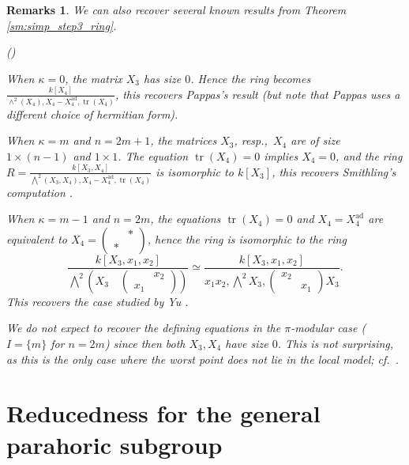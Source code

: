 \documentclass[pdflatex,sn-mathphys-num]{sn-jnl}%
\theoremstyle{thmstyleone}%
\theoremstyle{thmstyletwo}%
\newtheorem{remarks}[subsubsection]{Remarks}%
\numberwithin{equation}{subsection}
\theoremstyle{thmstylethree}%
\newcommand{\ad}{\mathrm{ad}}
\DeclareMathOperator{\tr}{tr}
\newenvironment{altenumerate}
	{\begin{list}
			{(\theenumi) }
			{\usecounter{enumi}
				\setlength{\labelwidth}{0pt}
				\setlength{\labelsep}{0pt}
				\setlength{\leftmargin}{0pt}
				\setlength{\itemsep}{\the\smallskipamount}
				\renewcommand{\theenumi}{\roman{enumi}}
		}}
		{\end{list}}
\begin{document}
		
\begin{remarks}\label{max_red:recover}
We can also recover several known results from Theorem \ref{sm:simp_step3_ring}.
\begin{altenumerate}
\item When $\kappa=0$, the matrix $X_3$ has size $0$. Hence the ring becomes $\frac{k[X_4]}{\wedge^2(X_4), X_4-X_4^{\ad},\tr(X_4)}$, this recovers Pappas's result \cite{Pappas2000} (but note that Pappas uses a different choice of hermitian form).
				
	\item When $\kappa=m$ and $n=2m+1$, the matrices $X_3$, resp.,\ $X_4$ are of size $1\times (n-1)$ and $1\times 1$. The equation $\tr(X_4)=0$ implies $X_4=0$, and the ring $R=\frac{k[X_3,X_4]}{\bigwedge^2 (X_3,X_4), X_4-X_4^{\ad},\tr(X_4)}$ is isomorphic to $k[X_3]$, this recovers Smithling's computation \cite[3.10, 3.11]{Smithling2015}.
				
	\item When $\kappa=m-1$ and $n=2m$, the equations $\tr(X_4)=0$ and $X_4=X_4^{\ad}$ are equivalent to $X_4=\left(\begin{matrix}  & * \\ * &\end{matrix}\right)$, hence the ring is isomorphic to the ring
	\begin{equation*}
		\frac{k[X_3,x_1,x_2]}{\bigwedge^2\left(X_3\quad\left(\begin{matrix}  & x_2 \\ x_1 &\end{matrix}\right)\right)}\simeq \frac{k[X_3,x_1,x_2]}{x_1x_2,\bigwedge^2X_3,\left(\begin{matrix}  x_2 & \\ & x_1\end{matrix}\right)X_3}.
	\end{equation*}
	This recovers the case studied by Yu \cite[1.4.22, 1.4.23, 1.4.24]{Yu2019}.
				
				
	\item We do not expect to recover the defining equations in the $\pi$-modular case \cite{RSZ2017} ($I=\{m\}$ for $n=2m$) since then both $X_3, X_4$ have size $0$. This is not surprising, as this is the only case where the worst point does not lie in the local model; cf.\ \cite[Remark 7.4]{PR2009}.
\end{altenumerate}
\end{remarks}
		
		
		
\section{Reducedness for the general parahoric subgroup}\label{general}
\end{document}
